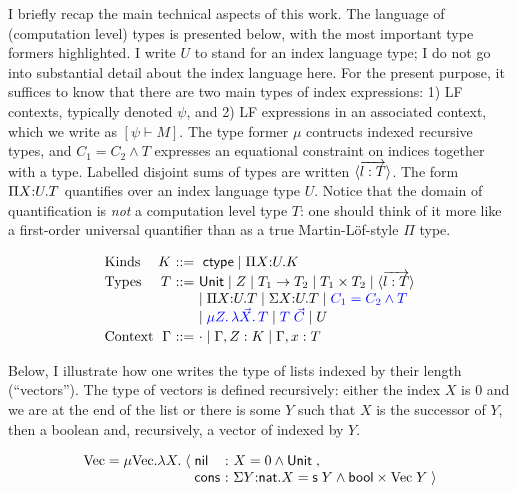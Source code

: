 \documentclass{article}
\begin{document}
I briefly recap the main technical aspects of this work. The
language of (computation level) types is presented below, with the
most important type formers highlighted. I write $U$ to stand for an index
language type; I do not go into substantial detail about the index
language here. For the present purpose, it suffices to know that there
are two main types of index expressions: 1) LF contexts, typically denoted
$\psi$, and 2) LF expressions in an associated context, which we write
as $[\psi \vdash M]$. The type former $\mu$ contructs indexed 
recursive types, and $C_1 = C_2 \wedge T$ expresses an equational constraint on indices together with
a type. Labelled disjoint sums of types are written $\langle \overrightarrow{l :
    T} \rangle$. The form $\Pi X{:}U. T$ quantifies over an index language
type $U$. Notice that the domain of quantification is \emph{not} a computation level
type $T$: one should think of it more like a first-order universal
quantifier than as a true Martin-L\"of-style $\Pi$ type. 

\[
\begin{array}{l@{~}r@{~}c@{~}l}
%
\mbox{Kinds} & K & \bnfas & \ctype \bnfalt \pibox X U K \\

\mbox{Types} & T  & \bnfas & 
        \m{Unit} 
\bnfalt Z 
\bnfalt T_1 \arrow T_2   
\bnfalt  T_1 \times T_2 
\bnfalt \dsum{\wvec{l : T}} 
\\
& & &   
\bnfalt \pibox X U T 
\bnfalt \sigmabox X U T 
\bnfalt {\color{blue} C_1 = C_2 \andalso T}
\\
&&&    
 \bnfalt {\color{blue} \mu Z.\,\mlam {\vec X}  T}
 \bnfalt {\color{blue} T\;{\vec C} }
\bnfalt U
\\[2pt] %
\mbox{Context} & \Gamma & \bnfas & \cdot \bnfalt \Gamma, Z:K \bnfalt \Gamma, x:T
\end{array}
\]

Below, I illustrate how one writes the type of lists indexed by their
length (``vectors''). The type of vectors is defined
recursively: either the index $X$ is 0 and we are at the end of the
list or there is some $Y$ such that $X$ is the successor of $Y$, then
a boolean and, recursively, a vector of indexed by $Y$.

\[
\begin{array}{r@{\;}c@{\;}l@{~:~}l}
%
\text{Vec} = \mu \text{Vec}. \lambda X. & \langle & \m{nil} &  X = 0 \andalso \tunit\;, \\
&  & \m{cons} &  \sigmabox Y \nat X = \m{s}\;Y \andalso \m{bool} \times \text{Vec}\;Y  \;\rangle 
\end{array}
\]
\end{document}
